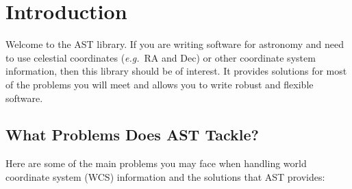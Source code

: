 \documentclass[twoside,11pt]{article}
\newcommand{\htmlref}[2]{#1}
\begin{document}
\vspace{7mm}

%
\section{Introduction}

Welcome to the AST library. If you are writing software for astronomy
and need to use celestial coordinates ({\em{e.g.}}\ RA and Dec) or
other coordinate system information, then this library should be of
interest. It provides solutions for most of the problems you will meet
and allows you to write robust and flexible software.


\subsection{What Problems Does AST Tackle?}

Here are some of the main problems you may face when handling world
coordinate system (WCS) information and the solutions that AST
provides:
\end{document}
